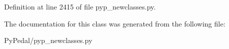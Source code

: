 Definition at line 2415 of file pyp\_\-newclasses.py.



The documentation for this class was generated from the following file:\begin{DoxyCompactItemize}
\item 
PyPedal/pyp\_\-newclasses.py\end{DoxyCompactItemize}
